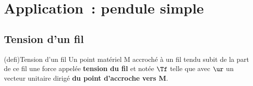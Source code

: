\documentclass[../../main/main.tex]{subfiles}
\begin{document}
\section{Application~: pendule simple}

\subsection{Tension d'un fil}
\begin{tcb*}[sidebyside, righthand ratio=.18](defi){Tension d'un fil}
	Un point matériel M accroché à un fil tendu subit de la part de ce fil une
	force appelée \textbf{tension du fil} et notée $\Tf$ telle que
	\psw{%
		\[\boxed{\Tf = -T \,\ur}\]
	}%
	avec $\ur$ un vecteur unitaire dirigé \textbf{du point d'accroche vers M}.
	\tcblower
	\begin{center}
\end{center}
\end{tcb*}
\end{document}
